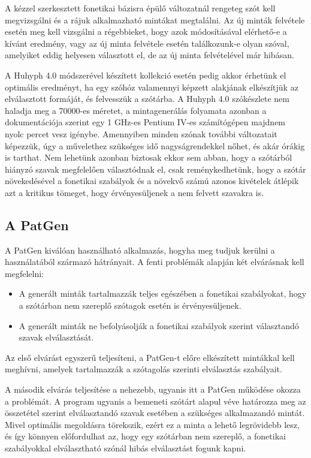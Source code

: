 \documentclass[12pt]{article}
\begin{document}
A kézzel szerkesztett fonetikai bázisra épülő változatnál rengeteg
szót kell megvizsgálni és a rájuk alkalmazható mintákat megtalálni.
Az új minták felvétele esetén meg kell vizsgálni a régebbieket, hogy
azok módosításával elérhető-e a kívánt eredmény, vagy az új minta
felvétele esetén találkozunk-e olyan szóval, amelyiket eddig helyesen
választott el, de az új minta felvételével már hibásan.

A Huhyph 4.0 módszerével készített kollekció esetén pedig akkor érhetünk
el optimális eredményt, ha egy szóhóz valamennyi képzett alakjának
elkészítjük az elválasztott formáját, és felvesszük a szótárba. A
Huhyph 4.0 szókészlete nem haladja meg a 70000-es méretet, a mintagenerálás
folyamata azonban a dokumentációja szerint egy 1 GHz-es Pentium IV-es
számítógépen majdnem nyolc percet vesz igénybe. Amennyiben minden
szónak további változatait képezzük, úgy a művelethez szükséges idő
nagyságrendekkel nőhet, és akár órákig is tarthat. Nem lehetünk azonban
biztosak ekkor sem abban, hogy a szótárból hiányzó szavak megfelelően
választódnak el, csak reménykedhetünk, hogy a szótár növekedésével
a fonetikai szabályok és a növekvő számú azonos kivételek átlépik
azt a kritikus tömeget, hogy érvényesüljenek a nem felvett szavakra
is.


\subsection{A PatGen}

A PatGen kiválóan használható alkalmazás, hogyha meg tudjuk kerülni
a használatából származó hátrányait. A fenti problémák alapján két
elvárásnak kell megfelelni:

\begin{itemize}
\item A generált minták tartalmazzák teljes egészében a fonetikai szabályokat,
hogy a szótárban nem szereplő szótagok esetén is érvényesüljenek.
\item A generált minták ne befolyásolják a fonetikai szabályok szerint választandó
szavak elválasztását.
\end{itemize}
Az első elvárást egyszerű teljesíteni, a PatGen-t előre elkészített
mintákkal kell meghívni, amelyek tartalmazzák a szótagolás szerinti
elválasztás szabályait.

A második elvárás teljesítése a nehezebb, ugyanis itt a PatGen működése
okozza a problémát. A program ugyanis a bemeneti szótárt alapul véve
határozza meg az összetétel szerint elválasztandó szavak esetében
a szükséges alkalmazandó mintát. Mivel optimális megoldásra törekszik,
ezért ez a minta a lehető legrövidebb lesz, és így könnyen előfordulhat
az, hogy egy szótárban nem szereplő, a fonetikai szabályokkal elválasztható
szónál hibás elválasztást fogunk kapni.
\end{document}
